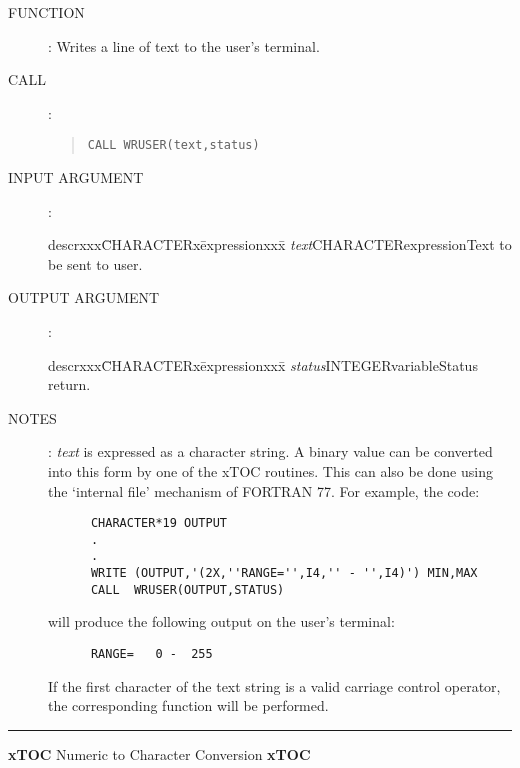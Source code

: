 \documentclass{article}
\begin{document}
\begin{description}
\item [FUNCTION]:
Writes a line of text to the user's terminal.
\item [CALL]:
\begin{quote}
{\tt CALL WRUSER(text,status)}
\end{quote}
\item [INPUT ARGUMENT]:
\begin{tabbing}
descrxxx\=CHARACTERx\=expressionxxx\=\kill
{\em text}\>CHARACTER\>expression\>Text to be sent to user.
\end{tabbing}
\item [OUTPUT ARGUMENT]:
\begin{tabbing}
descrxxx\=CHARACTERx\=expressionxxx\=\kill
{\em status}\>INTEGER\>variable\>Status return.
\end{tabbing}
\item [NOTES]:
{\em text} is expressed as a character string.
A binary value can be  converted into this form by one of the xTOC routines.
This can also be done using the `internal file' mechanism of FORTRAN 77.
For example, the code:
\begin{verbatim}
      CHARACTER*19 OUTPUT
      .
      .
      WRITE (OUTPUT,'(2X,''RANGE='',I4,'' - '',I4)') MIN,MAX
      CALL  WRUSER(OUTPUT,STATUS)
\end{verbatim}
will produce the following output on the user's terminal:
\begin{verbatim}
      RANGE=   0 -  255
\end{verbatim}
If the first character of the text string is a valid carriage control operator,
the corresponding function will be performed.
\end{description}
\rule{\textwidth}{0.3mm}
{\Large {\bf xTOC} \hfill Numeric to Character Conversion \hfill {\bf xTOC}}
\end{document}
